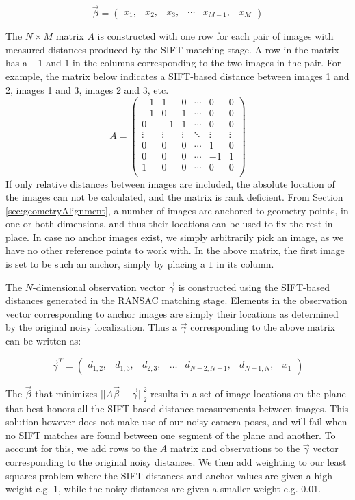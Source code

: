 \documentclass[]{spie}  %
\begin{document}
\[\vec{\beta} =
\begin{pmatrix}
  x_1, & x_2, & x_3, & \cdots & x_{M-1}, & x_M
\end{pmatrix}
\]

The $N \times M$ matrix $A$ is constructed with one row for each pair
of images with measured distances produced by the SIFT matching
stage. A row in the matrix has a $-1$ and $1$ in the columns
corresponding to the two images in the pair. For example, the matrix
below indicates a SIFT-based distance between images 1 and 2, images 1
and 3, images 2 and 3, etc.
\[
A =
\begin{pmatrix}
  -1 & 1 & 0 & \cdots & 0 & 0\\
  -1 & 0 & 1 & \cdots & 0 & 0\\
  0 & -1 & 1 & \cdots & 0 & 0\\
  \vdots  & \vdots & \vdots & \ddots & \vdots  & \vdots\\
  0 & 0 & 0 & \cdots & 1 & 0 \\
  0 & 0 & 0 & \cdots & -1 & 1 \\
  1 & 0 & 0 & \cdots & 0 & 0\\
\end{pmatrix}
\]
If only relative distances between images are included, the absolute
location of the images can not be calculated, and the matrix is rank
deficient. From Section \ref{sec:geometryAlignment}, a number of
images are anchored to geometry points, in one or both dimensions, and
thus their locations can be used to fix the rest in place. In case no
anchor images exist, we simply arbitrarily pick an image, as we have
no other reference points to work with. In the above matrix, the first
image is set to be such an anchor, simply by placing a $1$ in its
column.

The $N$-dimensional observation vector $\vec{\gamma}$ is constructed
using the SIFT-based distances generated in the RANSAC matching
stage. Elements in the observation vector corresponding to anchor
images are simply their locations as determined by the original noisy
localization. Thus a $\vec{\gamma}$ corresponding to the above matrix
can be written as:

\[
\vec{\gamma}^T =
\begin{pmatrix}
  d_{1,2}, &d_{1,3}, &d_{2,3}, &\hdots &d_{N-2,N-1}, &d_{N-1,N}, &x_1
\end{pmatrix}
\]

The $\vec{\beta}$ that minimizes $||A \vec{\beta} -
\vec{\gamma}||_2^2$ results in a set of image locations on the plane
that best honors all the SIFT-based distance measurements between
images. This solution however does not make use of our noisy camera
poses, and will fail when no SIFT matches are found between one
segment of the plane and another. To account for this, we add rows to
the $A$ matrix and observations to the $\vec{\gamma}$ vector
corresponding to the original noisy distances. We then add weighting
to our least squares problem where the SIFT distances and anchor
values are given a high weight e.g. 1, while the noisy distances are
given a smaller weight e.g. 0.01.
\end{document}
